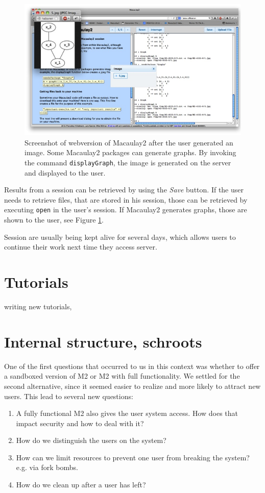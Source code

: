 \documentclass[]{article}
\begin{document}
\begin{figure}[htb]
    \includegraphics[width=.95\textwidth]{withGraph.jpg}
    \caption{Screenshot of webversion of Macaulay2 after the user
      generated an image. Some Macaulay2 packages can generate
      graphs. By invoking the command {\tt displayGraph}, the image is
      generated on the server and displayed to the user.}
    \label{fig:graph}
\end{figure}

Results from a session can be retrieved by using the {\it Save}
button. If the user needs to retrieve files, that are stored in his
session, those can be retrieved by executing {\tt open} in the user's
session. If Macaulay2 generates graphs, those are shown to the user,
see Figure \ref{fig:graph}.

Session are usually being kept alive for several days, which allows
users to continue their work next time they access server.

\section{Tutorials}
writing new tutorials,

\section{Internal structure, schroots}

One of the first questions that occurred to us in this context was
whether to offer a sandboxed version of M2 or M2 with full
functionality.  We settled for the second alternative, since it seemed
easier to realize and more likely to attract new users.  This lead to
several new questions:

\begin{enumerate}
\item A fully functional M2 also gives the user system access. How does that impact security and how to deal with it?
\item How do we distinguish the users on the system?
\item How can we limit resources to prevent one user from breaking the system? e.g. via fork bombs.
\item How do we clean up after a user has left?
\end{enumerate}
\end{document}
